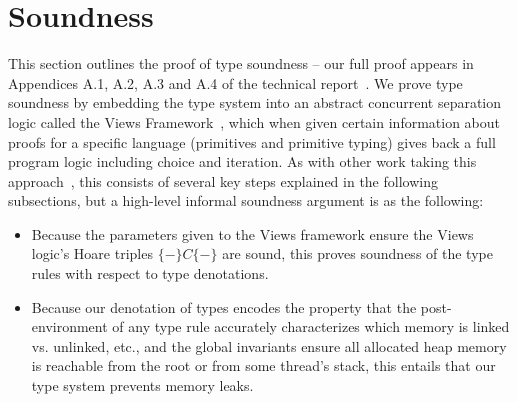 \section{Soundness}
\label{sec:soundness}
This section outlines the proof of type soundness -- our full proof appears in Appendices A.1, A.2, A.3 and A.4 of the technical report~\cite{isotek}.
We prove type soundness by embedding the type system into an abstract concurrent separation logic called the Views Framework~\cite{views}, which when given certain information about proofs for a specific language (primitives and primitive typing) gives back a full program logic including choice and iteration. As with other work taking this approach~\cite{oopsla12,toplas17}, this consists of several key steps explained in the following subsections, but a high-level informal soundness argument is as the following:
\begin{itemize}
\item Because the parameters given to the Views framework ensure the Views logic's Hoare triples $\{-\}C\{-\}$ are sound, this proves soundness of the type rules with respect to type denotations.
\item Because our denotation of types encodes the property that the post-environment of any type rule accurately characterizes which memory is linked vs. unlinked, etc., and the global invariants ensure all allocated heap memory is reachable from the root or from some thread's stack, this entails that our type system prevents memory leaks.
  \end{itemize}
